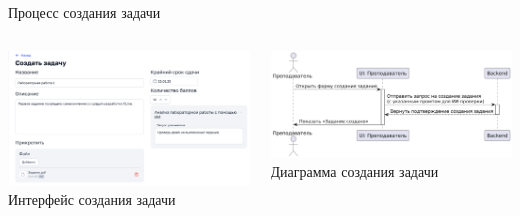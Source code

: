 \documentclass[aspectratio=169]{beamer}
\begin{document}
%

\begin{frame}{Процесс создания задачи}
\vspace{0.5em}

\begin{columns}
    \begin{column}{0.5\textwidth}
        \centering
        \includegraphics[width=\linewidth]{static/TaskCreate.png} \\
        \small Интерфейс создания задачи
    \end{column}
    \begin{column}{0.5\textwidth}
        \centering
        \includegraphics[width=\linewidth]{static/TaskCreateDiagram.png} \\
        \small Диаграмма создания задачи
    \end{column}
\end{columns}
\end{frame}
\end{document}
